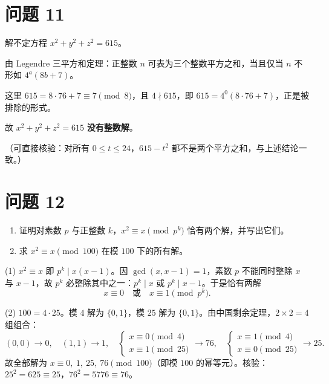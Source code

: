 \documentclass{article}
\begin{document}
\section{问题 11}

解不定方程 $x^2+y^2+z^2=615$。

\begin{solution}
  由 Legendre 三平方和定理：正整数 $n$ 可表为三个整数平方之和，当且仅当 $n$ 不形如 $4^a(8b+7)$。

  这里 $615=8\cdot 76+7\equiv 7\pmod 8$，且 $4\nmid 615$，即 $615=4^0(8\cdot76+7)$，正是被排除的形式。

  故 $x^2+y^2+z^2=615$ \textbf{没有整数解}。

  （可直接核验：对所有 $0\le t\le 24$，$615-t^2$ 都不是两个平方之和，与上述结论一致。）
\end{solution}

\section{问题 12}

\begin{enumerate}[(1)]
  \item 证明对素数 $p$ 与正整数 $k$，$x^2\equiv x\pmod{p^k}$ 恰有两个解，并写出它们。
  \item 求 $x^2\equiv x\pmod{100}$ 在模 $100$ 下的所有解。
\end{enumerate}

\begin{solution}
  (1) $x^2\equiv x$ 即 $p^k\mid x(x-1)$。因 $\gcd(x,x-1)=1$，素数 $p$ 不能同时整除 $x$ 与 $x-1$，故 $p^k$ 必整除其中之一：$p^k\mid x$ 或 $p^k\mid x-1$。于是恰有两解
  \[
    x\equiv 0\quad\text{或}\quad x\equiv 1\pmod{p^k}.
  \]

  (2) $100=4\cdot 25$。模 $4$ 解为 $\{0,1\}$，模 $25$ 解为 $\{0,1\}$。由中国剩余定理，$2\times2=4$ 组组合：
  \[
    (0,0)\to 0,\quad (1,1)\to 1,\quad
    \begin{cases}x\equiv0\!\!\pmod4\\ x\equiv1\!\!\pmod{25}\end{cases}\to 76,\quad
    \begin{cases}x\equiv1\!\!\pmod4\\ x\equiv0\!\!\pmod{25}\end{cases}\to 25.
  \]
  故全部解为 $\boxed{x\equiv 0,\ 1,\ 25,\ 76\pmod{100}}$（即模 $100$ 的幂等元）。核验：$25^2=625\equiv25$，$76^2=5776\equiv76$。
\end{solution}
\end{document}
